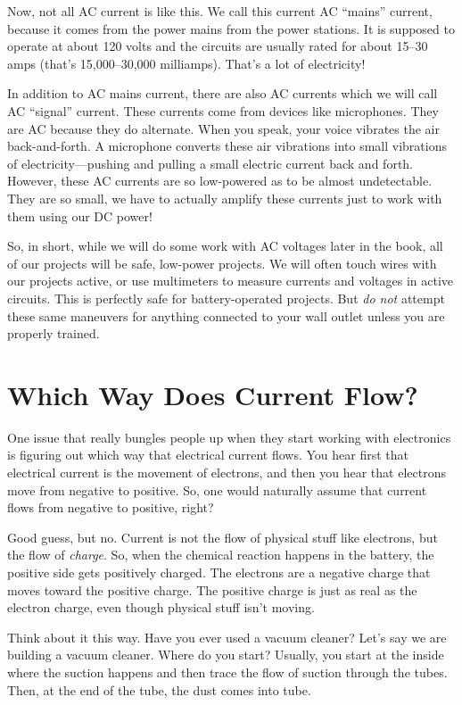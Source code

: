 Now, not all AC current is like this.  
We call this current AC ``mains'' current, because it comes from the power mains from the power stations.
It is supposed to operate at about 120 volts and the circuits are usually rated for about 15--30 amps (that's 15,000--30,000 milliamps).
That's a lot of electricity!

In addition to AC mains current, there are also AC currents which we will call AC ``signal'' current.
These currents come from devices like microphones.
They are AC because they do alternate.
When you speak, your voice vibrates the air back-and-forth.
A microphone converts these air vibrations into small vibrations of electricity---pushing and pulling a small electric current back and forth.
However, these AC currents are so low-powered as to be almost undetectable.
They are so small, we have to actually amplify these currents just to work with them using our DC power!

So, in short, while we will do some work with AC voltages later in the book, all of our projects will be safe, low-power projects.
We will often touch wires with our projects active, or use multimeters to measure currents and voltages in active circuits.
This is perfectly safe for battery-operated projects.
But \emph{do not} attempt these same maneuvers for anything connected to your wall outlet unless you are properly trained.

\section{Which Way Does Current Flow?}

One issue that really bungles people up when they start working with electronics is figuring out which way that electrical current flows.
You hear first that electrical current is the movement of electrons, and then you hear that electrons move from negative to positive.
So, one would naturally assume that current flows from negative to positive, right?

Good guess, but no.
Current is not the flow of physical stuff like electrons, but the flow of \emph{charge}.
So, when the chemical reaction happens in the battery, the positive side gets positively charged.
The electrons are a negative charge that moves toward the positive charge.
The positive charge is just as real as the electron charge, even though physical stuff isn't moving.

Think about it this way.
Have you ever used a vacuum cleaner?
Let's say we are building a vacuum cleaner.
Where do you start?
Usually, you start at the inside where the suction happens and then trace the flow of suction through the tubes.
Then, at the end of the tube, the dust comes into tube.

